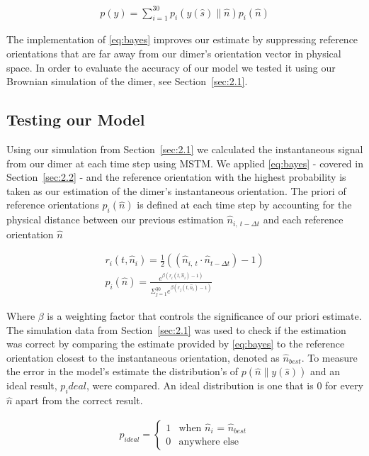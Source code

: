 \documentclass[final, 3p]{elsarticle}
\begin{document}
\begin{align}
	p(y) = \sum\limits_{i=1}^{30} p_i(y(\hat{s})\parallel\hat{n})p_i(\hat{n})
 \end{align}

The implementation of \eqref{eq:bayes} improves our estimate by suppressing reference orientations that are far away from our dimer's orientation vector in physical space. In order to evaluate the accuracy of our model we tested it using our Brownian simulation of the dimer, see Section~\ref{sec:2.1}.

\subsection{Testing our Model}
\label{sec:2.3}
Using our simulation from Section~\ref{sec:2.1} we calculated the instantaneous signal from our dimer at each time step using MSTM.  We applied \eqref{eq:bayes} - covered in Section~\ref{sec:2.2} - and the reference orientation with the highest probability is taken as our estimation of the dimer's instantaneous orientation. The priori of reference orientations $p_i(\hat{n})$ is defined at each time step by accounting for the physical distance between our previous estimation $\hat{n}_{i, \ t - \Delta t}$ and each reference orientation $\hat{n}$ 

\begin{align}
	r_i(t, \hat{n}_i)= \frac{1}{2}((\hat{n}_{i,\ t} \cdot \hat{n}_{t-\Delta t})-1) \\
	p_i(\hat{n})= \frac{e^{\beta (r_i(t,\hat{n}_i)-1)}}
	{\Sigma_{j=1}^{30}e^{\beta(r_j(t, \hat{n}_i)-1)}}
\end{align}

Where $\beta$ is a weighting factor that controls the significance of our priori estimate. The simulation data from Section~\ref{sec:2.1} was used to check if the estimation was correct by comparing the estimate provided by \eqref{eq:bayes} to the reference orientation closest to the instantaneous orientation, denoted as $\hat{n}_{best}$. To measure the error in the model's estimate the distribution's of $p(\hat{n}\parallel y(\hat{s}))$ and an ideal result, $p_ideal$, were compared. An ideal distribution is one that is 0 for every $\hat{n}$ apart from the correct result. 

\begin{align}
	p_{ideal} = 
	\begin{cases}
		1 & \text{when $\hat{n}_i$ = $\hat{n}_{best}$}\\
		0 & \text{anywhere else}
	\end{cases}
\end{align}
\end{document}
